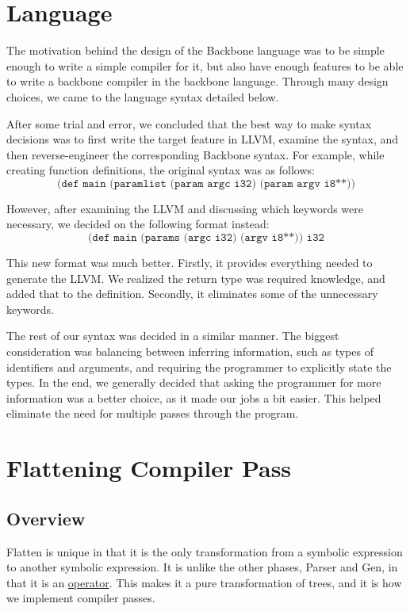 \documentclass[journal=jacsat, manuscript=article]{achemso}
\begin{document}
\section{Language}

The motivation behind the design of the Backbone language was to be
simple enough to write a simple compiler for it, but also have enough
features to be able to write a backbone compiler in the backbone language.
Through many design choices, we came to the language syntax detailed below. 

After some trial and error, we concluded that the best way to make syntax decisions was to first write the target feature in LLVM, examine the syntax, and then reverse-engineer the corresponding Backbone syntax. For example, while creating function definitions, the original syntax was as follows: 
$$\texttt{(def main (paramlist (param argc i32) (param argv i8**))}$$

However, after examining the LLVM and discussing which keywords were necessary, we decided on the following format instead:
$$\texttt{(def main (params (argc i32) (argv i8**)) i32}$$

This new format was much better. Firstly, it provides everything needed to generate the LLVM. We realized the return type was required knowledge, and added that to the definition. Secondly, it eliminates some of the unnecessary keywords.

The rest of our syntax was decided in a similar manner. The biggest consideration was balancing between inferring information, such as types of identifiers and arguments, and requiring the programmer to explicitly state the types. In the end, we generally decided that asking the programmer for more information was a better choice, as it made our jobs a bit easier. This helped eliminate the need for multiple passes through the program.

\section{Flattening Compiler Pass}

\subsection{Overview}

Flatten is unique in that it is the only transformation from a symbolic expression to another symbolic expression. It is unlike the
other phases, Parser and Gen, in that it is an
\href{https://en.wikipedia.org/wiki/Operator_(mathematics)}{operator}. This makes it a pure
transformation of trees, and it is how we implement compiler passes.
\end{document}
